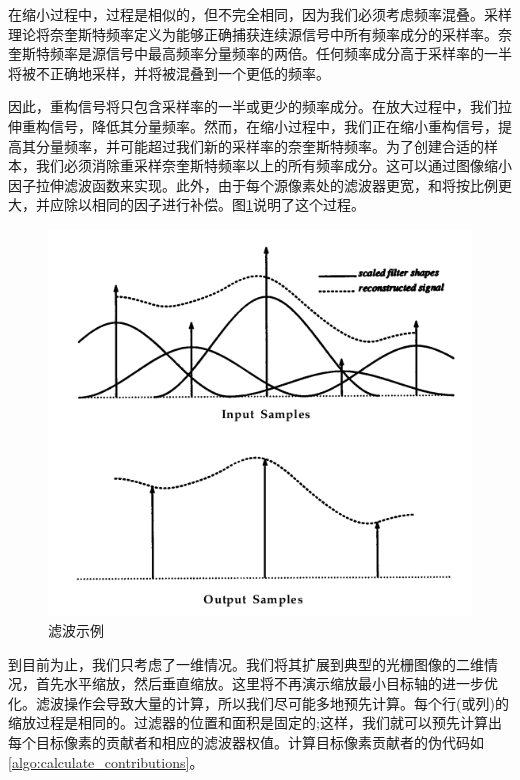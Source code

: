 \begin{CJK}{UTF8}{gbsn}
在缩小过程中，过程是相似的，但不完全相同，因为我们必须考虑频率混叠。采样理论将奈奎斯特频率定义为能够正确捕获连续源信号中所有频率成分的采样率。奈奎斯特频率是源信号中最高频率分量频率的两倍。任何频率成分高于采样率的一半将被不正确地采样，并将被混叠到一个更低的频率。

因此，重构信号将只包含采样率的一半或更少的频率成分。在放大过程中，我们拉伸重构信号，降低其分量频率。然而，在缩小过程中，我们正在缩小重构信号，提高其分量频率，并可能超过我们新的采样率的奈奎斯特频率。为了创建合适的样本，我们必须消除重采样奈奎斯特频率以上的所有频率成分。这可以通过图像缩小因子拉伸滤波函数来实现。此外，由于每个源像素处的滤波器更宽，和将按比例更大，并应除以相同的因子进行补偿。图\ref{fig:sinc3}说明了这个过程。

\begin{figure}[htbp]%
  \centering
  \includegraphics[totalheight=4in]{./fig/1.2.3.png}
  \caption{滤波示例} 
  \label{fig:sinc3}
\end{figure}

到目前为止，我们只考虑了一维情况。我们将其扩展到典型的光栅图像的二维情况，首先水平缩放，然后垂直缩放。这里将不再演示缩放最小目标轴的进一步优化。滤波操作会导致大量的计算，所以我们尽可能多地预先计算。每个行(或列)的缩放过程是相同的。过滤器的位置和面积是固定的;这样，我们就可以预先计算出每个目标像素的贡献者和相应的滤波器权值。计算目标像素贡献者的伪代码如\ref{algo:calculate_contributions}。

\IncMargin{1em}
\begin{algorithm} 


\end{algorithm}
\end{CJK}
